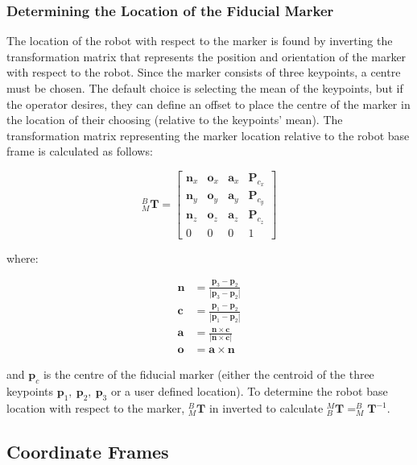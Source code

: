 \subsubsection{Determining the Location of the Fiducial Marker}

The location of the robot with respect to the marker is found by inverting the transformation matrix that represents the position and orientation of the marker with respect to the robot. Since the marker consists of three keypoints, a centre must be chosen. The default choice is selecting the mean of the keypoints, but if the operator desires, they can define an offset to place the centre of the marker in the location of their choosing (relative to the keypoints' mean). The transformation matrix representing the marker location relative to the robot base frame is calculated as follows:

\begin{equation}
    ^{B}_{M}\mathbf{T} = \begin{bmatrix}
    \mathbf{n}_x & \mathbf{o}_x & \mathbf{a}_x & \mathbf{P}_{c_x}\\
   \mathbf{n}_y & \mathbf{o}_y & \mathbf{a}_y & \mathbf{P}_{c_y}\\
   \mathbf{n}_z & \mathbf{o}_z & \mathbf{a}_z & \mathbf{P}_{c_z}\\
   0 & 0 & 0 & 1\end{bmatrix}\label{eq:1}
\end{equation}

\noindent where:

\begin{align}
    \mathbf{n} &= \frac{\mathbf{p}_3 - \mathbf{p}_2}{|\mathbf{p}_3 - \mathbf{p}_2|}\\
    \mathbf{c} &= \frac{\mathbf{p}_1 - \mathbf{p}_2}{|\mathbf{p}_1 - \mathbf{p}_2|}\\
    \mathbf{a} &= \frac{\mathbf{n}\times\mathbf{c}}{|\mathbf{n}\times\mathbf{c}|}\\
    \mathbf{o} &= \mathbf{a}\times\mathbf{n}
\end{align}

\noindent and $\mathbf{p}_c$ is the centre of the fiducial marker (either the centroid of the three keypoints $\mathbf{p}_1,\ \mathbf{p}_2,\ \mathbf{p}_3$ or a user defined location). To determine the robot base location with respect to the marker, $^{B}_{M}\mathbf{T}$ in inverted to calculate $^{M}_{B}\mathbf{T} = ^{B}_{M}\mathbf{T}^{-1}$.\\

\subsection{Coordinate Frames}

